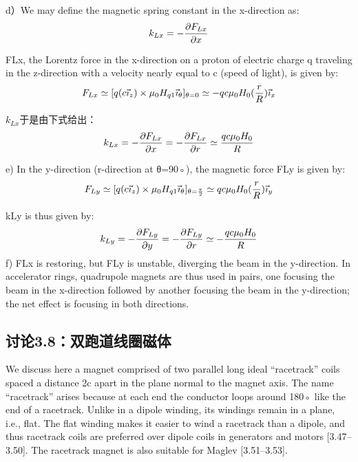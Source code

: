 d）We may define the magnetic spring constant in the x-direction as:
$$
k_{Lx}=-\frac{\partial F_{Lx}}{\partial x}\\%
$$

FLx, the Lorentz force in the x-direction on a proton of electric charge q traveling
in the z-direction with a velocity nearly equal to c (speed of light), is given by:
$$
F_{Lx}\simeq[q(c\vec{\imath}_{z})\times\mu_{0}H_{q1}\vec{\imath}_{\theta}]_{\theta=0}\\
\simeq-qc\mu_{0}H_{0}(\frac{r}{R})\vec{\imath}_{x}\\%
$$

$k_{Lx}$于是由下式给出：
$$k_{Lx}=-\frac{\partial F_{Lx}}{\partial x}=-\frac{\partial F_{Lx}}{\partial r}\\
\simeq \frac{qc\mu_{0}H_{0}}{R}\\%
$$

e) In the y-direction (r-direction at θ=90◦), the magnetic force FLy is given by:
$$
F_{Ly}\simeq[q(c\vec{\imath}_{z})\times\mu_{0}H_{q1}\vec{\imath}_{\theta}]_{\theta=\frac{\pi}{2}}\\
\simeq qc\mu_{0}H_{0}(\frac{r}{R})\vec{\imath}_{y}\\%
$$

kLy is thus given by:
$$
k_{Ly}=-\frac{\partial F_{Ly}}{\partial y}=-\frac{\partial F_{Ly}}{\partial r}\\
\simeq-\frac{qc \mu_{0}H_{0}}{R}\\%
$$
f) FLx is restoring, but FLy is unstable, diverging the beam in the y-direction.
In accelerator rings, quadrupole magnets are thus used in pairs, one focusing the
beam in the x-direction followed by another focusing the beam in the y-direction;
the net effect is focusing in both directions.
\newpage



\subsection{讨论3.8：双跑道线圈磁体}
We discuss here a magnet comprised of two parallel long ideal “racetrack” coils
spaced a distance 2c apart in the plane normal to the magnet axis. The name
“racetrack” arises because at each end the conductor loops around 180◦ like the
end of a racetrack. Unlike in a dipole winding, its windings remain in a plane, i.e.,
flat. The flat winding makes it easier to wind a racetrack than a dipole, and thus
racetrack coils are preferred over dipole coils in generators and motors [3.47–3.50].
The racetrack magnet is also suitable for Maglev [3.51–3.53].

